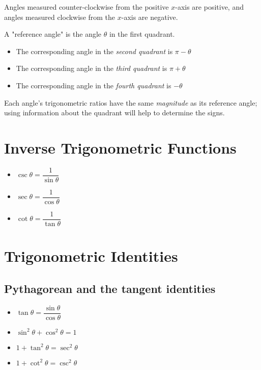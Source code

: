\documentclass[11pt]{article}
\begin{document}
\noindent Angles measured counter-clockwise from the positive $x$-axis are positive, and angles measured clockwise from the $x$-axis are negative.

\noindent A "reference angle" is the angle $\theta$ in the first quadrant.
\begin{itemize}
  \item The corresponding angle in the \textit{second quadrant} is $\pi - \theta$
  \item The corresponding angle in the \textit{third quadrant} is $\pi + \theta$
  \item The corresponding angle in the \textit{fourth quadrant} is $- \theta$
\end{itemize}
Each angle's trigonometric ratios have the same \textit{magnitude} as its reference angle; using information about the quadrant will help to determine the signs.

\pagebreak

\section{Inverse Trigonometric Functions}

\begin{itemize}
  \item $\csc \theta = \dfrac{1}{\sin\theta}$
  \item $\sec \theta = \dfrac{1}{\cos\theta}$
  \item $\cot \theta = \dfrac{1}{\tan\theta}$
\end{itemize}

\section{Trigonometric Identities}

\subsection{Pythagorean and the tangent identities}

\begin{itemize}
  \item $\tan \theta = \dfrac{\sin \theta}{\cos \theta}$
  \item $\sin^2 \theta +\cos^2 \theta = 1$
  \item $1 + \tan^2 \theta = \sec^2 \theta$
  \item $1 + \cot^2 \theta = \csc^2 \theta$
\end{itemize}
\end{document}
